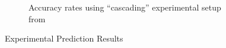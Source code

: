 \begin{figure}
\begin{subfigure}[b]{0.45\textwidth}
    \caption{Accuracy rates using ``cascading'' experimental setup from \cite{DBLP:journals/corr/ChengADKL14}}
    \label{fig:jurerocks}  
  \end{subfigure}
  \caption{Experimental Prediction Results}
\end{figure}  


